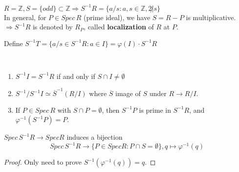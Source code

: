 \begin{example}
     $ R=\mathbb{Z},S=\{odd\}\subset \mathbb{Z}\Rightarrow S^{-1}R=\{a/s:a,s\in \mathbb{Z},2\not |s\} $ \\
     In general, for  $ P\in Spec\, R $ (prime ideal), we have  $ S=R-P  $ is multiplicative. \\
      $ \Rightarrow S^{-1}R $ is denoted by  $ R_P $, called \textbf{localization} of  $ R  $ at  $ P  $. 
\end{example}
Define  $ S^{-1}T=\{a/s\in S^{-1}R:a\in I\}=\varphi(I)\cdot S^{-1}R $
\begin{proposition}
    \,
    \begin{enumerate}
        \item  $ S^{-1}I=S^{-1}R $ if and only if  $ S\cap I\not=\emptyset $ 
        \item  $ S^{-1}/S^{-1}I\simeq \overline{S}^{-1}(R/I) $ where  $ \overline{S} $ image of  $ S $ under  $ R\rightarrow R/I $.
        \item If  $ P\in Spec\, R $ with  $ S\cap P=\emptyset $, then  $ S^{-1}P  $ is prime in  $ S^{-1}R$,  and $ \varphi^{-1}(S^{-1}P)=P $.      
    \end{enumerate}
\end{proposition} 
\begin{theorem}
     $ Spec\, S^{-1}R\rightarrow Spec R $ induces a bijection
     \[Spec\, S^{-1}R\rightarrow \{P\in Spec R:P\cap S=\emptyset\}, q\mapsto \varphi^{-1}(q)\] 
\end{theorem}
\begin{proof}
    Only need to prove  $ S^{-1}(\varphi^{-1}(q))=q $. 
\end{proof}